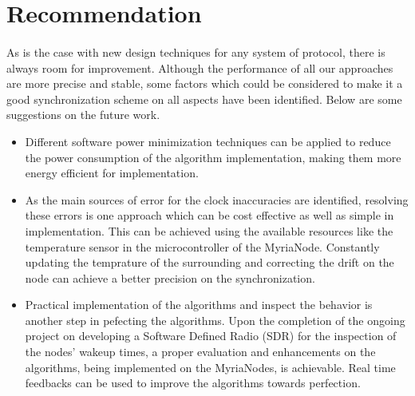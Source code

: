 \documentclass[a4paper,10pt]{report}
\begin{document}
\section{\textbf{Recommendation}}
\paragraph*{}
As is the case with new design techniques for any system of
protocol, there is always room for improvement. Although the
performance of all our approaches are more precise and stable,  some
factors which could be considered to make it a good synchronization
scheme on all aspects have been identified. Below are some
suggestions on the future work.
\begin{itemize}
\item
Different software power minimization techniques can be applied to reduce the power consumption of the algorithm implementation, making them more energy efficient for implementation.
\item  As the main sources of error for the clock inaccuracies are identified, resolving these errors is one approach which can be cost effective as well as simple in implementation. This can be achieved using the available resources like the temperature sensor in the microcontroller of the MyriaNode. Constantly updating the temprature of the surrounding and correcting the drift on the node can achieve a better precision on the synchronization.
\item
Practical implementation of the algorithms and inspect the behavior is another step in pefecting the algorithms. Upon the completion of the ongoing project on developing a Software Defined Radio (SDR) for the inspection of the nodes' wakeup times, a proper evaluation and enhancements on the algorithms, being implemented on the MyriaNodes, is achievable. Real time feedbacks can be used to improve the algorithms towards perfection.
\end{itemize}
\appendix
\end{document}
